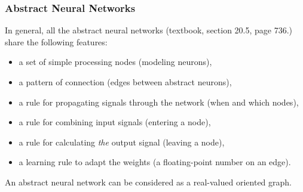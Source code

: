 
%
\begin{frame}
\frametitle{Abstract Neural Networks}

In general, all the abstract neural networks (textbook, section 20.5,
page 736.) share the following features:
\begin{itemize}

  \item a set of simple processing nodes (modeling neurons),

  \item a pattern of connection (edges between abstract neurons),

  \item a rule for propagating signals through the network (when and
  which nodes),

  \item a rule for combining input signals (entering a node),

  \item a rule for calculating \emph{the} output signal (leaving a
  node),

  \item a learning rule to adapt the weights (a floating-point number
  on an edge).

\end{itemize}
An abstract neural network can be considered as a real-valued
oriented graph.

\end{frame}

